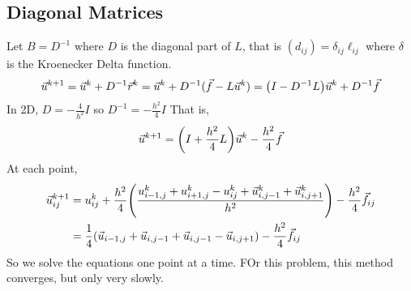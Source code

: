 \documentclass{article}
\begin{document}
        \subsection{Diagonal Matrices}
            Let $B = D^{-1}$ where $D$ is the diagonal part of $L$, that is $(d_{ij}) = \delta_{ij}\ell_{ij}$ where $\delta$ is the Kroenecker Delta function.
            \begin{align*}
                \vec{u}^{k+1} = \vec{u}^k + D^{-1}\vec{r}^k = \vec{u}^k + D^{-1}(\vec{f} - L\vec{u}^k) = \qty(I - D^{-1}L)\vec{u}^k + D^{-1}\vec{f}
            \end{align*}
            In 2D, $D = -\frac{4}{h^2}I$ so $D^{-1} = -\frac{h^2}{4}I$  That is,
            \begin{align*}
                \vec{u}^{k+1} = \qty(I + \frac{h^2}{4}L)\vec{u}^k - \frac{h^2}{4}\vec{f}
            \end{align*}
            At each point,
            \begin{align*}
                \vec{u}_{ij}^{k+1} &= u_{ij}^k + \frac{h^2}{4}\qty(\frac{u_{i-1,j}^k + u_{i+1,j}^k - u_{ij}^k + \vec{u}_{i,j-1}^k + \vec{u}_{i,j+1}^k}{h^2}) - \frac{h^2}{4}\vec{f}_{ij} \\
                &= \frac{1}{4}\qty(\vec{u}_{i-1,j} + \vec{u}_{i,j-1} + \vec{u}_{i,j-1} - \vec{u}_{i,j+1}) - \frac{h^2}{4}\vec{f}_{ij}
            \end{align*}
            So we solve the equations one point at a time.  FOr this problem, this method converges, but only very slowly.
\end{document}
